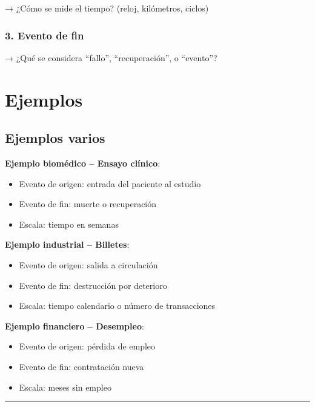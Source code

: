 \documentclass[
  letterpaper,
  DIV=11,
  numbers=noendperiod]{scrartcl}
\providecommand{\tightlist}{%
  \setlength{\itemsep}{0pt}\setlength{\parskip}{0pt}}
\begin{document}
→ ¿Cómo se mide el tiempo? (reloj, kilómetros, ciclos)

\subsubsection{3. Evento de fin}\label{evento-de-fin}

→ ¿Qué se considera ``fallo'', ``recuperación'', o ``evento''?

\section{Ejemplos}\label{ejemplos}

\subsection{Ejemplos varios}\label{ejemplos-varios}

\textbf{Ejemplo biomédico -- Ensayo clínico}:

\begin{itemize}
\tightlist
\item
  Evento de origen: entrada del paciente al estudio
\item
  Evento de fin: muerte o recuperación
\item
  Escala: tiempo en semanas
\end{itemize}

\textbf{Ejemplo industrial -- Billetes}:

\begin{itemize}
\tightlist
\item
  Evento de origen: salida a circulación
\item
  Evento de fin: destrucción por deterioro
\item
  Escala: tiempo calendario o número de transacciones
\end{itemize}

\textbf{Ejemplo financiero -- Desempleo}:

\begin{itemize}
\tightlist
\item
  Evento de origen: pérdida de empleo
\item
  Evento de fin: contratación nueva
\item
  Escala: meses sin empleo
\end{itemize}

\begin{center}\rule{0.5\linewidth}{0.5pt}\end{center}
\end{document}
